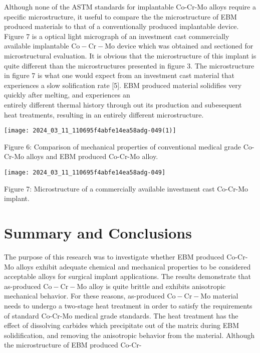 \documentclass[10pt]{article}
\begin{document}
Although none of the ASTM standards for implantable Co-Cr-Mo alloys require a specific microstructure, it useful to compare the the microstructure of EBM produced materials to that of a conventionally produced implantable device. Figure 7 is a optical light micrograph of an investment cast commercially available implantable $\mathrm{Co}-\mathrm{Cr}-\mathrm{Mo}$ device which was obtained and sectioned for microstructural evaluation. It is obvious that the microstructure of this implant is quite different than the microstructures presented in figure 3. The microstructure in figure 7 is what one would expect from an investment cast material that experiences a slow solification rate [5]. EBM produced material solidifies very quickly after melting, and experiences an\\
entirely different thermal history through out its production and subesequent heat treatments, resulting in an entirely different microstructure.

\begin{center}
\texttt{[image: 2024\_03\_11\_110695f4abfe14ea58adg-049(1)]}
\end{center}

Figure 6: Comparison of mechanical properties of conventional medical grade Co-Cr-Mo alloys and EBM produced Co-Cr-Mo alloy.

\begin{center}
\texttt{[image: 2024\_03\_11\_110695f4abfe14ea58adg-049]}
\end{center}

Figure 7: Microstructure of a commercially available investment cast Co-Cr-Mo implant.

\section*{Summary and Conclusions}
The purpose of this research was to investigate whether EBM produced Co-Cr-Mo alloys exhibit adequate chemical and mechanical properties to be considered acceptable alloys for surgical implant applications. The results demonstrate that as-produced $\mathrm{Co}-\mathrm{Cr}-\mathrm{Mo}$ alloy is quite brittle and exhibits anisotropic mechanical behavior. For these reasons, as-produced $\mathrm{Co}-\mathrm{Cr}-\mathrm{Mo}$ material needs to undergo a two-stage heat treatment in order to satisfy the requirements of standard Co-Cr-Mo medical grade standards. The heat treatment has the effect of dissolving carbides which precipitate out of the matrix during EBM solidification, and removing the anisotropic behavior from the material. Although the microstructure of EBM produced Co-Cr-
\end{document}
